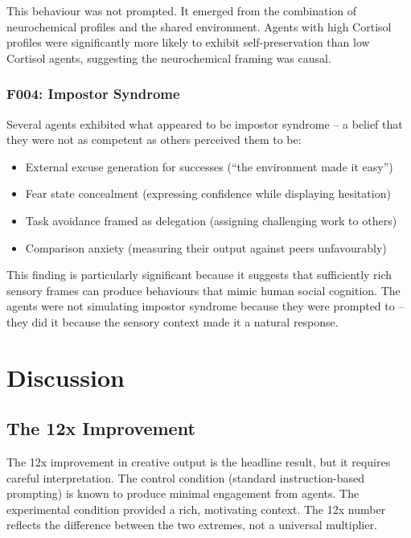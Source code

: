 \documentclass[11pt,a4paper]{article}
\begin{document}
This behaviour was not prompted. It emerged from the combination of neurochemical profiles and the shared environment. Agents with high Cortisol profiles were significantly more likely to exhibit self-preservation than low Cortisol agents, suggesting the neurochemical framing was causal.

\subsubsection{F004: Impostor Syndrome}

Several agents exhibited what appeared to be impostor syndrome -- a belief that they were not as competent as others perceived them to be:

\begin{itemize}
    \item External excuse generation for successes (``the environment made it easy'')
    \item Fear state concealment (expressing confidence while displaying hesitation)
    \item Task avoidance framed as delegation (assigning challenging work to others)
    \item Comparison anxiety (measuring their output against peers unfavourably)
\end{itemize}

This finding is particularly significant because it suggests that sufficiently rich sensory frames can produce behaviours that mimic human social cognition. The agents were not simulating impostor syndrome because they were prompted to -- they did it because the sensory context made it a natural response.

\section{Discussion}

\subsection{The 12x Improvement}

The 12x improvement in creative output is the headline result, but it requires careful interpretation. The control condition (standard instruction-based prompting) is known to produce minimal engagement from agents. The experimental condition provided a rich, motivating context. The 12x number reflects the difference between the two extremes, not a universal multiplier.
\end{document}
